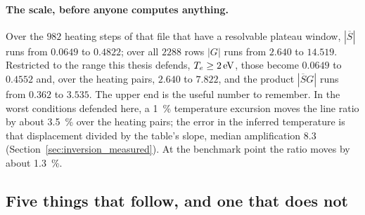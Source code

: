 \paragraph{The scale, before anyone computes anything.} Over the $982$ heating
steps of that file that have a resolvable plateau window, $|\overline{S}|$ runs
from $0.0649$ to $0.4822$; over all $2288$ rows $|G|$ runs from $2.640$ to
$14.519$. Restricted to the range this thesis defends, $T_e\ge\SI{2}{\electronvolt}$,
those become $0.0649$ to $0.4552$ and, over the heating pairs, $2.640$ to
$7.822$, and the product
$|\overline{S}G|$ runs from $0.362$ to $3.535$. The upper end is the useful
number to remember. In the worst conditions defended here, a \SI{1}{\percent}
temperature excursion moves the line ratio by about \SI{3.5}{\percent} over
the heating pairs; the error in the inferred temperature is that displacement
divided by the table's slope, median amplification $8.3$
(Section~\ref{sec:inversion_measured}). At the benchmark point the ratio moves
by about \SI{1.3}{\percent}.

\subsection{Five things that follow, and one that does not}

